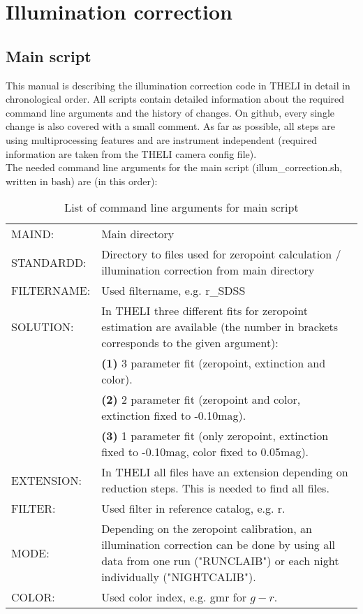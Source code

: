 \section{Illumination correction}
\label{sec:IlluminationCorrection}

\subsection{Main script}
\label{subsec:MainScript}
This manual is describing the illumination correction code in THELI in detail in chronological order. All scripts contain detailed information about the required command line arguments and the history of changes. On github, every single change is also covered with a small comment. As far as possible, all steps are using multiprocessing features and are instrument independent (required information are taken from the THELI camera config file).\\
The needed command line arguments for the main script (illum\_correction.sh, written in bash) are (in this order):

\begin{table}[H]
\centering
\begin{tabular}{lp{11.5cm}}
MAIND: & Main directory\\
STANDARDD: & Directory to files used for zeropoint calculation / illumination correction from main directory\\
FILTERNAME: & Used filtername, e.g. r\_SDSS\\
SOLUTION: & In \textrm{THELI} three different fits for zeropoint estimation are available (the number in brackets corresponds to the given argument):\\
 & \textbf{(1)} 3 parameter fit (zeropoint, extinction and color).\\
 & \textbf{(2)} 2 parameter fit (zeropoint and color, extinction fixed to -0.10mag).\\
 & \textbf{(3)} 1 parameter fit (only zeropoint, extinction fixed to -0.10mag, color fixed to 0.05mag).\\
EXTENSION: & In \textrm{THELI} all files have an extension depending on reduction steps. This is needed to find all files.\\
FILTER: & Used filter in reference catalog, e.g. r.\\
MODE: & Depending on the zeropoint calibration, an illumination correction can be done by using all data from one run ("RUNCLAIB") or each night individually ("NIGHTCALIB").\\
COLOR: & Used color index, e.g. gmr for $g-r$.
\end{tabular}
\caption{List of command line arguments for main script}
\label{tab:CommandLineArgumentsMainScript}
\end{table}

